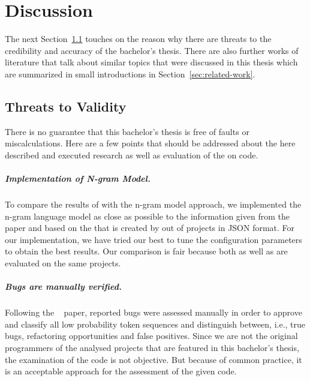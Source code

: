 \chapter{Discussion}\label{ch:discussion}
The next Section~\ref{sec:threats-to-validity} touches on the reason why there are threats to the credibility and accuracy of the bachelor's thesis. There are also further works of literature that talk about similar topics that were discussed in this thesis which are summarized in small introductions in Section~\ref{sec:related-work}.

\section{Threats to Validity}\label{sec:threats-to-validity}
There is no guarantee that this bachelor's thesis is free of faults or miscalculations. Here are a few points that should be addressed about the here described and executed research as well as evaluation of the \ngram{} on \scratch{} code.

\paragraph{Implementation of N-gram Model.}
To compare the results of \litterbox{} with the n-gram model approach, we implemented the n-gram language model as close as possible to the information given from the \bugram{}~\cite{bugram} paper and based on the \AST{} that is created by \litterbox{} out of \scratch{} projects in JSON format. For our implementation, we have tried our best to tune the configuration parameters to obtain the best results. Our comparison is fair because both \litterbox{} as well as \ngram{} are evaluated on the same projects.

\paragraph{Bugs are manually verified.}
Following the \bugram{}~\cite{bugram} paper, reported bugs were assessed manually in order to approve and classify all low probability token sequences and distinguish between, i.e., true bugs, refactoring opportunities and false positives. Since we are not the original programmers of the analysed projects that are featured in this bachelor's thesis, the examination of the code is not objective. But because of common practice, it is an acceptable approach for the assessment of the given code.

